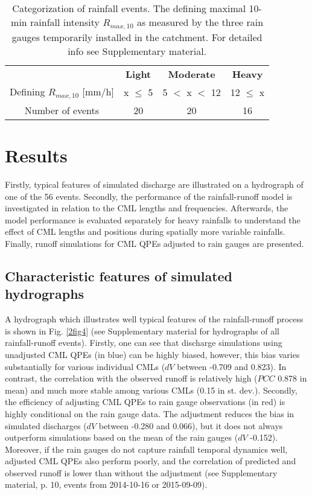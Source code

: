 \documentclass{ctuthesis}\usepackage[]{graphicx}\usepackage[]{color}
\begin{document}
\begin{table}[h]
\begin{ctucolortab}
\centering
\begin{tabular}{ c | c  c  c  }
	    &       \textbf{Light}   &  \bfseries Moderate  &  \bfseries  Heavy    \\ \Midrule
        Defining $R_{max,10}$ [mm/h]  &  x $\leq$ 5  & 5 $<$ x $<$ 12 &  12 $\leq$ x     \\
            Number of events  &  20  & 20 &  16
\end{tabular}
\caption{Categorization of rainfall events. The defining maximal 10-min rainfall intensity $R_{max,10}$ as measured by the three rain gauges temporarily installed in the catchment. For detailed info see Supplementary material.}
\label{2tab2}
\end{ctucolortab}
\end{table}

\section{Results}

Firstly, typical features of simulated discharge are illustrated on a hydrograph of one of the 56 events. Secondly, the performance of the rainfall-runoff model is investigated in relation to the CML lengths and frequencies. Afterwards, the model performance is evaluated separately for heavy rainfalls to understand the effect of CML lengths and positions during spatially more variable rainfalls. Finally, runoff simulations for CML QPEs adjusted to rain gauges are presented.

\subsection{Characteristic features of simulated hydrographs}

A hydrograph which illustrates well typical features of the rainfall-runoff process is shown in Fig. \ref{2fig4} (see Supplementary material for hydrographs of all rainfall-runoff events). Firstly, one can see that discharge simulations using unadjusted CML QPEs (in blue) can be highly biased, however, this bias varies substantially for various individual CMLs ($dV$ between -0.709 and 0.823). In contrast, the correlation with the observed runoff is relatively high ($PCC$ 0.878 in mean) and much more stable among various CMLs (0.15 in st. dev.). Secondly, the efficiency of adjusting CML QPEs to rain gauge observations (in red) is highly conditional on the rain gauge data. The adjustment reduces the bias in simulated discharges ($dV$ between -0.280 and 0.066), but it does not always outperform simulations based on the mean of the rain gauges ($dV$ -0.152). Moreover, if the rain gauges do not capture rainfall temporal dynamics well, adjusted CML QPEs also perform poorly, and the correlation of predicted and observed runoff is lower than without the adjustment (see Supplementary material, p. 10, events from 2014-10-16 or 2015-09-09).
\end{document}
